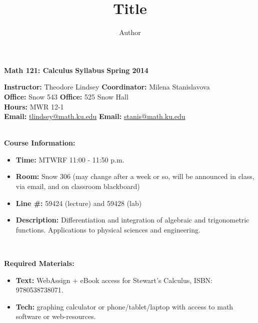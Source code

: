 \documentclass[10pt]{amsart}
\title{Title}
\author{Author}
\begin{document}
{\bf Math 121: Calculus} \hfill {\bf Syllabus} \hfill {\bf Spring 2014}

\hrulefill 

\vspace{.5cm}

{\bf Instructor:} Theodore Lindsey 	\hfill  {\bf Coordinator:} Milena Stanislavova \hspace{.15cm} \\
{\bf Office:} Snow 543	\hfill  {\bf Office:} 525 Snow Hall  \hspace{2.2cm} \\
{\bf Hours:} MWR 12-1 	\hfill   \\
{\bf Email:} \href{mailto:tlindsey@math.ku.edu}{tlindsey@math.ku.edu}	\hfill  {\bf Email:} \href{mailto:stanis@math.ku.edu}{stanis@math.ku.edu} \hspace{1.25cm} \\



\,\

{\bf Course Information:}
\begin{itemize}
	\item {\bf Time:} MTWRF 11:00 - 11:50 p.m. 
	\item {\bf Room:} Snow 306 (may change after a week or so, will be announced in class, via email, and on classroom blackboard)
	\item {\bf Line \#:} 59424 (lecture) and 59428 (lab)
	\item {\bf Description:} Differentiation and integration of algebraic and trigonometric functions. Applications to physical sciences and engineering.
\end{itemize}

\,\,

{\bf Required Materials:}
\begin{itemize}
	\item {\bf Text:} WebAssign + eBook access for Stewart's Calculus, ISBN: 9780538738071. 
	\item {\bf Tech:} graphing calculator or phone/tablet/laptop with access to math software or web-resources. 
\end{itemize}

\,\,
\end{document}
